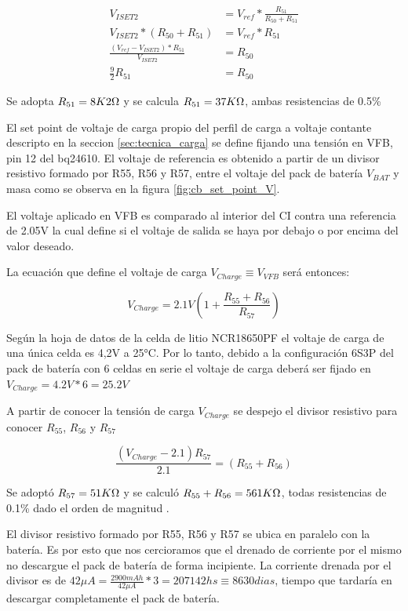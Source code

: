 \documentclass[10pt,a4paper]{article}
\begin{document}
\begin{align}
    V_{ISET2}&=V_{ref}*\frac{R_{51}}{R_{50}+R_{51}}\\
    V_{ISET2}*(R_{50}+R_{51})&=V_{ref}*R_{51}\\
    \frac{(V_{ref}-V_{ISET2})*R_{51}}{V_{ISET2}}&=R_{50} \\
    \frac{9}{2}R_{51}&=R_{50}
\end{align}

Se adopta $R_{51} = 8K2\ohm$ y se calcula $R_{51} = 37K\ohm$, ambas resistencias
de 0.5\%

El set point de voltaje de carga propio del perfil de carga a voltaje contante
descripto en la seccion \ref{sec:tecnica_carga} se define fijando una tensión en
VFB, pin 12 del bq24610. El voltaje de referencia es obtenido a partir de un
divisor resistivo formado por R55, R56 y R57, entre el voltaje del pack de
batería $V_{BAT}$ y masa como se observa en la figura \ref{fig:cb_set_point_V}. 

El voltaje aplicado en VFB es comparado al interior del \acrshort{CI} contra una
referencia de 2.05V la cual define si el voltaje de salida se haya por debajo o
por encima del valor deseado. 

La ecuación que define el voltaje de carga $V_{Charge} \equiv V_{VFB}$ será entonces:

\begin{equation}
    V_{Charge}=2.1V(1+\frac{R_{55}+R_{56}}{R_{57}})
\end{equation}

Según la hoja de datos de la celda de litio NCR18650PF el voltaje de carga de
una única celda es 4,2V a 25°C. Por lo tanto, debido a la configuración 6S3P del
pack de batería con 6 celdas en serie el voltaje de carga deberá ser fijado en
$V_{Charge} = 4.2V*6 = 25.2V$

A partir de conocer la tensión de carga $V_{Charge}$ se despejo el divisor
resistivo para conocer $R_{55}$, $R_{56}$ y $R_{57}$

\begin{equation}
	\frac{(V_{Charge}- 2.1)R_{57}}{2.1}=(R_{55}+R_{56})
\end{equation}

Se adoptó $R_{57}= 51K\ohm$ y se calculó $R_{55}+R_{56}=561K\ohm$, todas
resistencias de 0.1\% dado el orden de magnitud .

El divisor resistivo formado por R55, R56 y R57 se ubica en paralelo con la
batería. Es por esto que nos cercioramos que el drenado de corriente por el
mismo no descargue el pack de batería de forma incipiente. La corriente drenada
por el divisor es de $42\mu A=\frac{2900mAh}{42\mu A}*3=207142 hs \equiv 8630
dias$, tiempo que tardaría en descargar completamente el pack de batería.
\end{document}
